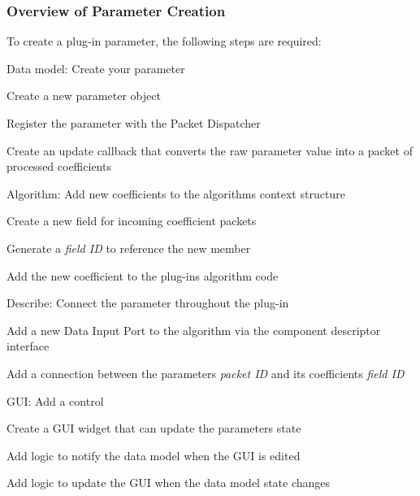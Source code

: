 \hypertarget{a00324_subsection__overview_of_parameter_creation}{}\subsubsection{Overview of Parameter Creation}\label{a00324_subsection__overview_of_parameter_creation}
 To create a plug-\/in parameter, the following steps are required\+: 
\begin{DoxyEnumerate}
\item Data model\+: Create your parameter 
\begin{DoxyEnumerate}
\item Create a new parameter object  
\item Register the parameter with the Packet Dispatcher  
\item Create an update callback that converts the raw parameter value into a packet of processed coefficients  
\end{DoxyEnumerate}
\item Algorithm\+: Add new coefficients to the algorithm\textquotesingle{}s context structure 
\begin{DoxyEnumerate}
\item Create a new field for incoming coefficient packets  
\item Generate a {\itshape field I\+D} to reference the new member  
\item Add the new coefficient to the plug-\/in\textquotesingle{}s algorithm code  
\end{DoxyEnumerate}
\item Describe\+: Connect the parameter throughout the plug-\/in 
\begin{DoxyEnumerate}
\item Add a new Data Input Port to the algorithm via the component descriptor interface  
\item Add a connection between the parameter\textquotesingle{}s {\itshape packet I\+D} and its coefficients\textquotesingle{} {\itshape field I\+D} 
\end{DoxyEnumerate}
\item G\+U\+I\+: Add a control 
\begin{DoxyEnumerate}
\item Create a G\+U\+I widget that can update the parameter\textquotesingle{}s state  
\item Add logic to notify the data model when the G\+U\+I is edited  
\item Add logic to update the G\+U\+I when the data model state changes  
\end{DoxyEnumerate}
\end{DoxyEnumerate}

